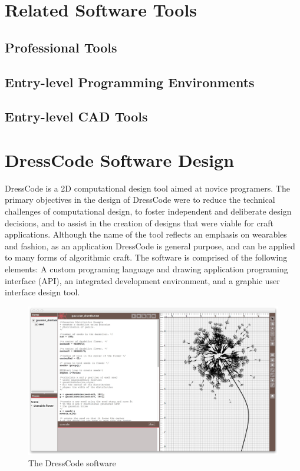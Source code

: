 \documentclass{sigchi}
\begin{document}
\section{Related Software Tools}
\subsection{Professional Tools}
\subsection{Entry-level Programming Environments}
\subsection{Entry-level CAD Tools}

\section{DressCode Software Design}
DressCode is a 2D computational design tool aimed at novice programers. The primary objectives in the design of DressCode were to reduce the technical challenges of computational design, to foster independent and deliberate design decisions, and to assist in the creation of designs that were viable for craft applications. Although the name of the tool reflects an emphasis on wearables and fashion, as an application DressCode is general purpose, and can be applied to many forms of algorithmic craft. The software is comprised of the following elements: A custom programing language and drawing application programing interface (API), an integrated development environment, and a graphic user interface design tool. 
\begin{center}
\begin{figure}[h!]
\includegraphics[width=\columnwidth]{images/dresscode_interface.jpg}
\caption{The DressCode software}
\label{fig:dresscode_interface}
\end{figure}
\end{center}
\end{document}
